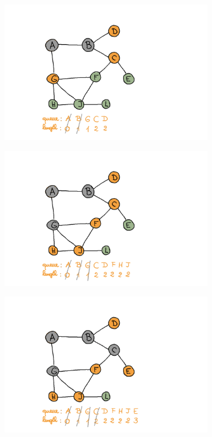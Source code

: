 \begin{enumerate}[(a)]
\begin{figure}[H]
\begin{subfigure}[h]{0.45\textwidth}
    \raggedright
    \includegraphics[width=\textwidth]{Pictures/SP/panda_gebissen_2.png}
    \end{subfigure}
    \qquad
    \begin{subfigure}[h]{0.45\textwidth}
    \raggedleft
    \includegraphics[width=\textwidth]{Pictures/SP/panda_gebissen_3.png}
    \end{subfigure}
    \begin{subfigure}[h]{0.45\textwidth}
    \includegraphics[width=\textwidth]{Pictures/SP/panda_gebissen_4.png}

\end{subfigure}
\end{figure}
\end{enumerate}
